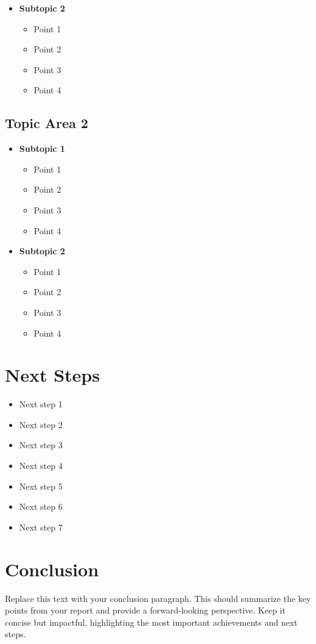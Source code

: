 \documentclass[10pt,a4paper]{article}
\begin{document}
\begin{multicols}{2}
\begin{itemize}
  \item \textbf{Subtopic 2}
    \begin{itemize}
      \item Point 1
      \item Point 2
      \item Point 3
      \item Point 4
    \end{itemize}
\end{itemize}

\subsection*{Topic Area 2}
\begin{itemize}\small
  \item \textbf{Subtopic 1}
    \begin{itemize}
      \item Point 1
      \item Point 2
      \item Point 3
      \item Point 4
    \end{itemize}
  
  \item \textbf{Subtopic 2}
    \begin{itemize}
      \item Point 1
      \item Point 2
      \item Point 3
      \item Point 4
    \end{itemize}
\end{itemize}

\section*{Next Steps}
\begin{itemize}\small
  \item Next step 1
  \item Next step 2
  \item Next step 3
  \item Next step 4
  \item Next step 5
  \item Next step 6
  \item Next step 7
\end{itemize}

\section*{Conclusion}
Replace this text with your conclusion paragraph. This should summarize the key points from your report and provide a forward-looking perspective. Keep it concise but impactful, highlighting the most important achievements and next steps.
\end{multicols}
\end{document}
